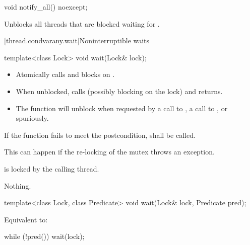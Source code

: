 %
\begin{itemdecl}
void notify_all() noexcept;
\end{itemdecl}

\begin{itemdescr}
\pnum\effects Unblocks all threads that are blocked waiting for .
\end{itemdescr}


{\color{insertcolor}
[thread.condvarany.wait]{Noninterruptible waits}
}

%
\begin{itemdecl}
template<class Lock>
  void wait(Lock& lock);
\end{itemdecl}

\begin{itemdescr}
\pnum
\effects
\begin{itemize}
\item Atomically calls  and blocks on .
\item When unblocked, calls  (possibly blocking on the lock) and returns.
\item The function will unblock when requested by a call to ,
a call to , or spuriously.
\end{itemize}

\pnum
\remarks
If the function fails to meet the postcondition, 
shall be called.
\begin{note} This can happen if the re-locking of the mutex throws an exception. \end{note}

\pnum\postconditions {} is locked by the calling thread.

\pnum\throws Nothing.

\end{itemdescr}


%
\begin{itemdecl}
template<class Lock, class Predicate>
  void wait(Lock& lock, Predicate pred);
\end{itemdecl}

\begin{itemdescr}
\pnum
\effects Equivalent to:
\begin{codeblock}
while (!pred())
  wait(lock);
\end{codeblock}
\end{itemdescr}


